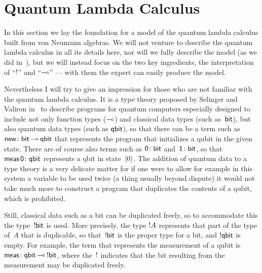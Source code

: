 \documentclass[a]{subfiles}
\begin{document}
\section{Quantum Lambda Calculus}
\begin{parsec}%
\begin{point}%
In this section
we lay the foundation
for a model
of the quantum lambda calculus
built from von Neumann algebras.
We will not venture
to describe the quantum lambda calculus
in all its details here,
nor will we fully describe the model
(as we did in~),
but we will instead
focus on the two key ingredients,
the interpretation of ``$\mathord{!}$'' and ``$\mathbin{\multimap}$''
---
with them the expert
can easily produce the model.

Nevertheless
I will try to give an impression for those who are not familiar 
with the quantum lambda calculus.
It is a type theory
proposed by Selinger and Valiron in~
to describe programs for quantum computers
especially designed
to include 
not only
function types ($\mathbin{\multimap}$)
and
classical data types (such as~$\mathsf{bit}$),
but also quantum data types
(such as $\mathsf{qbit}$),
so that there can be a term such as
$\mathsf{new}\colon \mathsf{bit}\mathbin{\multimap} \mathsf{qbit}$
that represents the program
that initializes a qubit in the given state.
There are of course also terms
such as
$\mathsf{0}\colon \mathsf{bit}$
and~$\mathsf{1}\colon \mathsf{bit}$,
so that~$\mathsf{meas}\,\mathsf{0}\colon \mathsf{qbit}$
represents a qbit in state~$\ket{0}$.
The addition of quantum data 
to a type theory
is a very delicate matter
for if one were to allow
for example
in this system
a variable to be used twice
(a thing usually beyond dispute)
it would not take much more
to construct
a program
that duplicates the contents
of a qubit,
which is prohibited.

Still, classical data
such as a bit
can be duplicated freely,
so to accommodate this 
the type~$\mathord{!} \mathsf{bit}$ is used.
More precisely,
the type
$\mathord{!} A$
represents that part of the type of~$A$ that is duplicable,
so that~$\mathord{!} \mathsf{bit}$
is the proper type for a bit,
and $\mathord{!}\mathsf{qbit}$ is empty.
For example,
the term that represents the measurement
of a qubit is~$\mathsf{meas}\colon \mathsf{qbit}\mathbin{\multimap} \mathord{!}\mathsf{bit}$,
where the~$\mathord{!}$ indicates that the bit resulting from the measurement
may be duplicated freely.


\end{point}
\end{parsec}
\end{document}

